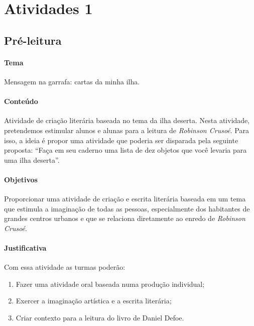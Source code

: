 \documentclass[12pt]{extarticle}
\begin{document}

\section{Atividades 1}

%

\subsection{Pré-leitura}


\paragraph{Tema} Mensagem na garrafa: cartas da minha ilha.

\paragraph{Conteúdo}
Atividade de criação literária baseada no tema da ilha deserta.
Nesta atividade, pretendemos estimular alunos e alunas para a leitura de
\emph{Robinson Crusoé}. Para isso, a ideia é propor uma atividade que
poderia ser disparada pela seguinte proposta: ``Faça em seu caderno uma
lista de dez objetos que você levaria para uma ilha deserta''.


\paragraph{Objetivos}
Proporcionar uma atividade de criação e escrita literária baseada em um
tema que estimula a imaginação de todas as pessoas, especialmente dos
habitantes de grandes centros urbanos e que se relaciona diretamente ao
enredo de \emph{Robinson Crusoé}.

\paragraph{Justificativa}
Com essa atividade as turmas poderão:

\begin{enumerate}
\item
Fazer uma atividade oral baseada numa produção individual; 

\item
Exercer a imaginação artística e a escrita literária;

\item
Criar contexto para a leitura do livro de Daniel Defoe.
\end{enumerate}
\end{document}

